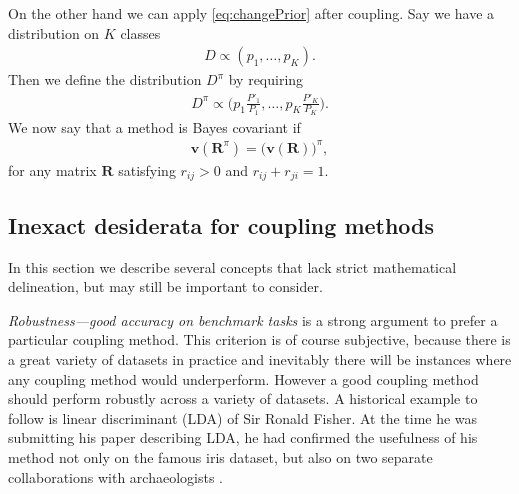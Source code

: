 On the other hand we can apply \eqref{eq:changePrior} after coupling. Say we have a distribution on $K$ classes
\begin{align}
D \propto (p_1, \ldots, p_K).
\end{align}
Then we define the distribution $D^\pi$ by requiring 
\begin{align}
D^\pi \propto \biggl(p_1 \frac{P'_1}{P_1}, \ldots, p_K \frac{P'_K}{P_K}\biggr). \label{def:prior:effect}
\end{align}
We now say that a method is Bayes covariant if
\begin{align}
\boldsymbol{v}(\boldsymbol{R}^\pi)=	\bigl(\boldsymbol{v}(\boldsymbol{R})\bigr)^\pi,
\end{align}
for any matrix $\boldsymbol{R}$ satisfying $r_{ij}> 0$ and $r_{ij}+r_{ji} = 1$.




%


\subsection{Inexact desiderata for coupling methods}

\label{sec:des:inexact}

In this section we describe several concepts that lack strict mathematical delineation, but may still be important to consider.

\emph{Robustness---good accuracy on benchmark tasks} is  a strong argument to prefer a particular coupling method. This criterion is of course subjective, because there is a great variety of datasets in practice and inevitably there will be instances where any coupling method would underperform. However a good coupling method should perform robustly across a variety of datasets. A historical  example to follow is linear discriminant (LDA) of  Sir Ronald Fisher. At the time he was submitting his paper describing LDA, 
he had confirmed the usefulness of his method not only on the famous iris dataset, but also on two separate collaborations with archaeologists \cite{barnard1935secular, martin1936study}. 

